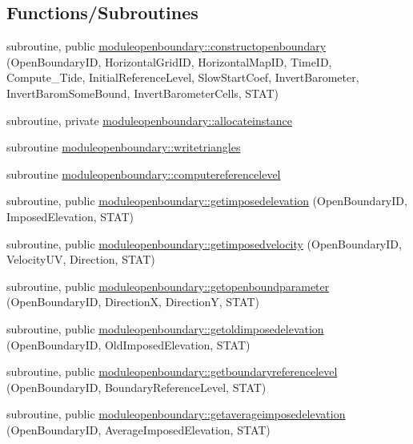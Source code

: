 \subsection*{Functions/\+Subroutines}
\begin{DoxyCompactItemize}
\item 
subroutine, public \mbox{\hyperlink{namespacemoduleopenboundary_a4de0cd486a833b86ff9e035de046ff81}{moduleopenboundary\+::constructopenboundary}} (Open\+Boundary\+ID, Horizontal\+Grid\+ID, Horizontal\+Map\+ID, Time\+ID, Compute\+\_\+\+Tide, Initial\+Reference\+Level, Slow\+Start\+Coef, Invert\+Barometer, Invert\+Barom\+Some\+Bound, Invert\+Barometer\+Cells, S\+T\+AT)
\item 
subroutine, private \mbox{\hyperlink{namespacemoduleopenboundary_ae4ec1e1f3e6b488135fbc86abcef0fc0}{moduleopenboundary\+::allocateinstance}}
\item 
subroutine \mbox{\hyperlink{namespacemoduleopenboundary_a0f8bf6cd86f964a155b3d7b4c3a54497}{moduleopenboundary\+::writetriangles}}
\item 
subroutine \mbox{\hyperlink{namespacemoduleopenboundary_a4aaa938f269710f21fa7500a3501905a}{moduleopenboundary\+::computereferencelevel}}
\item 
subroutine, public \mbox{\hyperlink{namespacemoduleopenboundary_a620ec04ba9bf0bef4684a93c01e856e3}{moduleopenboundary\+::getimposedelevation}} (Open\+Boundary\+ID, Imposed\+Elevation, S\+T\+AT)
\item 
subroutine, public \mbox{\hyperlink{namespacemoduleopenboundary_a4770186a431ef5de9034a0b7eb410c43}{moduleopenboundary\+::getimposedvelocity}} (Open\+Boundary\+ID, Velocity\+UV, Direction, S\+T\+AT)
\item 
subroutine, public \mbox{\hyperlink{namespacemoduleopenboundary_af306d4464c6cbd29390136a8103d1a2e}{moduleopenboundary\+::getopenboundparameter}} (Open\+Boundary\+ID, DirectionX, DirectionY, S\+T\+AT)
\item 
subroutine, public \mbox{\hyperlink{namespacemoduleopenboundary_a0388d8cc14f0fdd9f898ff4cf751b093}{moduleopenboundary\+::getoldimposedelevation}} (Open\+Boundary\+ID, Old\+Imposed\+Elevation, S\+T\+AT)
\item 
subroutine, public \mbox{\hyperlink{namespacemoduleopenboundary_a26e04e1ec6a8b2b4481ebb096e1c36b1}{moduleopenboundary\+::getboundaryreferencelevel}} (Open\+Boundary\+ID, Boundary\+Reference\+Level, S\+T\+AT)
\item 
subroutine, public \mbox{\hyperlink{namespacemoduleopenboundary_a52848b363ed0632be0c32b49a6d17cd4}{moduleopenboundary\+::getaverageimposedelevation}} (Open\+Boundary\+ID, Average\+Imposed\+Elevation, S\+T\+AT)

\end{DoxyCompactItemize}
